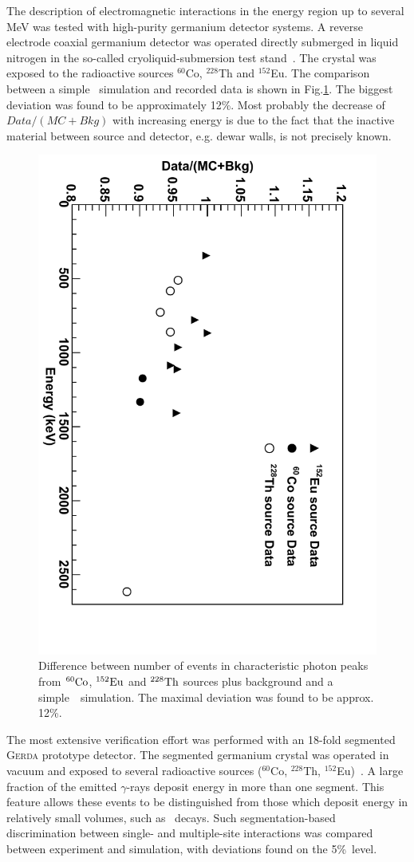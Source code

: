 \documentclass[article]{IEEEtran}
\begin{document}
The description of electromagnetic interactions in the energy region
up to several MeV was tested with high-purity germanium detector
systems. A reverse electrode coaxial germanium detector was operated
directly submerged in liquid nitrogen in the so-called cryoliquid-submersion
test stand~\cite{KKPHD}.  The crystal was exposed to the radioactive
sources $^{60}$Co, $^{228}$Th and $^{152}$Eu.  The comparison between
a simple \MaGe~simulation and recorded data is shown in
Fig.\ref{fig:cryoliquidsubmersion_mc}. The biggest deviation was found
to be approximately 12\%. Most probably the decrease of
$Data/(MC+Bkg)$ with increasing energy is due to the fact that the
inactive material between source and detector, e.g. dewar walls, is
not precisely known.\\


\begin{figure}[tbh]
\centering
\includegraphics[height=0.9\textwidth,angle=90]{plots/DataOverMcPeaksAll.pdf}
\caption{Difference between number of events in characteristic photon peaks from $\rm ^{60}Co$, $\rm ^{152}Eu$ and $\rm ^{228}Th$ sources plus background and a simple~\MaGe~simulation. The maximal deviation was found to be approx. 12\%.}
\label{fig:cryoliquidsubmersion_mc} 
\end{figure}
%
The most extensive verification effort was performed with an 18-fold
segmented \textsc{Gerda} prototype detector. The segmented germanium
crystal was operated in vacuum and exposed to several radioactive
sources ($^{60}$Co, $^{228}$Th,
$^{152}$Eu)~\cite{Abt:2007rg,Abt:2007rf}.  A large fraction of the
emitted $\gamma$-rays deposit energy in more than one segment. This
feature allows these events to be distinguished from those which
deposit energy in relatively small volumes, such as
\nubb\ decays.  Such segmentation-based discrimination
between single- and multiple-site interactions was compared between
experiment and simulation, with deviations found on the
5\%~level. \\
\end{document}
